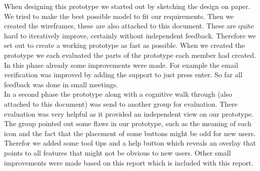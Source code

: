 When designing this prototype we started out by sketching the design on paper. We tried to make the best possible model to fit our requirements. Then we created the wireframes, these are also attached to this document. These are quite hard to iteratively improve, certainly without independent feedback. Therefore we set out to create a working prototype as fast as possible. When we created the prototype we each evaluated the parts of the prototype each member had created. In this phase already some improvements were made. For example the email verification was improved by adding the support to just press enter. So far all feedback was done in small meetings.\\
In a second phase the prototype along with a cognitive walk through (also attached to this document) was send to another group for evaluation. There evaluation was very helpful as it provided an independent view on our prototype. The group pointed out some flaws in our prototype, such as the meaning of each icon and the fact that the placement of some buttons might be odd for new users. Therefor we added some tool tips and a help button which reveals an overlay that points to all features that might not be obvious to new users. Other small improvements were made based on this report which is included with this report.
